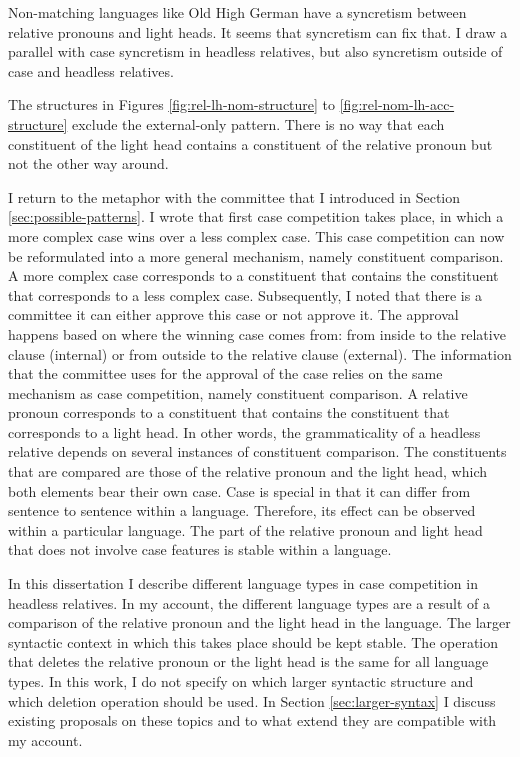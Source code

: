 Non-matching languages like Old High German have a syncretism between relative pronouns and light heads. It seems that syncretism can fix that. I draw a parallel with case syncretism in headless relatives, but also syncretism outside of case and headless relatives.

The structures in Figures \ref{fig:rel-lh-nom-structure} to \ref{fig:rel-nom-lh-acc-structure} exclude the external-only pattern. There is no way that each constituent of the light head contains a constituent of the relative pronoun but not the other way around.

I return to the metaphor with the committee that I introduced in Section \ref{sec:possible-patterns}. I wrote that first case competition takes place, in which a more complex case wins over a less complex case. This case competition can now be reformulated into a more general mechanism, namely constituent comparison. A more complex case corresponds to a constituent that contains the constituent that corresponds to a less complex case.
Subsequently, I noted that there is a committee it can either approve this case or not approve it. The approval happens based on where the winning case comes from: from inside to the relative clause (internal) or from outside to the relative clause (external). The information that the committee uses for the approval of the case relies on the same mechanism as case competition, namely constituent comparison. A relative pronoun corresponds to a constituent that contains the constituent that corresponds to a light head.
In other words, the grammaticality of a headless relative depends on several instances of constituent comparison. The constituents that are compared are those of the relative pronoun and the light head, which both elements bear their own case. Case is special in that it can differ from sentence to sentence within a language. Therefore, its effect can be observed within a particular language. The part of the relative pronoun and light head that does not involve case features is stable within a language.

In this dissertation I describe different language types in case competition in headless relatives. In my account, the different language types are a result of a comparison of the relative pronoun and the light head in the language.
The larger syntactic context in which this takes place should be kept stable. The operation that deletes the relative pronoun or the light head is the same for all language types. In this work, I do not specify on which larger syntactic structure and which deletion operation should be used. In Section \ref{sec:larger-syntax} I discuss existing proposals on these topics and to what extend they are compatible with my account.


